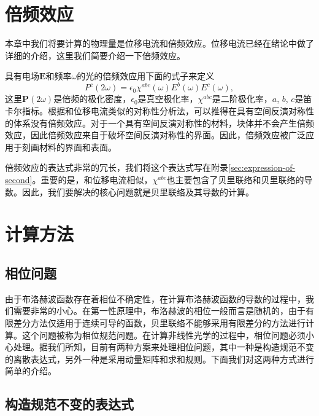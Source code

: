 \section{倍频效应}
本章中我们将要计算的物理量是位移电流和倍频效应。位移电流已经在绪论中做了详细的介绍，这里我们简要介绍一下倍频效应。

具有电场$\boldsymbol{E}$和频率$\omega$的光的倍频效应用下面的式子来定义
\begin{equation}
P^{c}(2\omega)=\epsilon_0\chi^{abc}(\omega)E^{b}(\omega)E^{c}(\omega),
\end{equation}
这里$\boldsymbol{P}(2\omega)$是倍频的极化密度，$\epsilon_0$是真空极化率，$\chi^{abc}$是二阶极化率，$a$, $b$, $c$是笛卡尔指标。根据和位移电流类似的对称性分析法，可以推得在具有空间反演对称性的体系没有倍频效应。对于一个具有空间反演对称性的材料，块体并不会产生倍频效应，因此倍频效应来自于破坏空间反演对称性的界面。因此，倍频效应被广泛应用于刻画材料的界面和表面。

倍频效应的表达式非常的冗长\cite{rashkeev_efficient_1998}，我们将这个表达式写在附录\ref{sec:expression-of-second}。重要的是，和位移电流相似，$\chi^{abc}$也主要包含了贝里联络和贝里联络的导数。因此，我们要解决的核心问题就是贝里联络及其导数的计算。

\section{计算方法}
\subsection{相位问题}

由于布洛赫波函数存在着相位不确定性，在计算布洛赫波函数的导数的过程中，我们需要非常的小心。在第一性原理中，布洛赫波的相位一般而言是随机的，由于有限差分方法仅适用于连续可导的函数，贝里联络不能够采用有限差分的方法进行计算。这个问题被称为相位规范问题。在计算非线性光学的过程中，相位问题必须小心处理。据我们所知，目前有两种方案来处理相位问题，其中一种是构造规范不变的离散表达式，另外一种是采用动量矩阵和求和规则。下面我们对这两种方式进行简单的介绍。


\subsection{构造规范不变的表达式}

